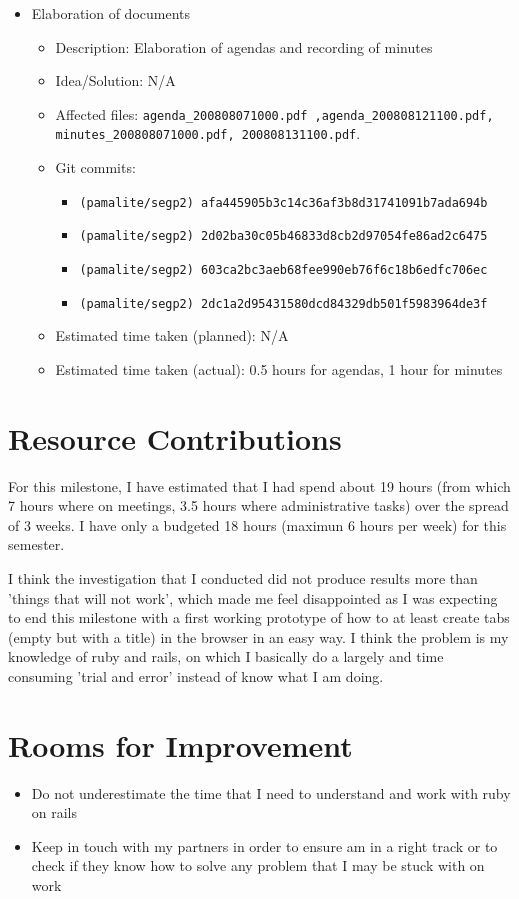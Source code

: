 \documentclass{article}
\begin{document}
\begin{itemize}
\begin{itemize}
	     \end{itemize}
	\item Elaboration of documents
	     \begin{itemize}
	         \item Description: Elaboration of agendas and recording of minutes 
	         \item Idea/Solution: N/A
	         \item Affected files: \texttt{agenda\_200808071000.pdf ,agenda\_200808121100.pdf, minutes\_200808071000.pdf, 200808131100.pdf}.  
	         \item Git commits: \begin{itemize}
	                             \item \texttt{(pamalite/segp2) afa445905b3c14c36af3b8d31741091b7ada694b}
				     \item \texttt{(pamalite/segp2) 2d02ba30c05b46833d8cb2d97054fe86ad2c6475}
				     \item \texttt{(pamalite/segp2) 603ca2bc3aeb68fee990eb76f6c18b6edfc706ec}
				     \item \texttt{(pamalite/segp2) 2dc1a2d95431580dcd84329db501f5983964de3f} 
	                            \end{itemize}
		 \item Estimated time taken (planned): N/A
	         \item Estimated time taken (actual): 0.5 hours for agendas, 1 hour for minutes
	     \end{itemize}
\end{itemize}

\section*{Resource Contributions}

For this milestone, I have estimated that I had spend about 19 hours (from which 7 hours where on meetings, 3.5 hours where administrative tasks) over the spread of 3 weeks. I have only a budgeted 18 hours (maximun 6 hours per week) for this semester. 

I think the investigation that I conducted did not produce results more than 'things that will not work', which made me feel disappointed as I was expecting to end this milestone with a first working prototype of how to at least create tabs (empty but with a title) in the browser in an easy way.  I think the problem is my knowledge of ruby and rails, on which I basically do a largely and time consuming 'trial and error' instead of know what I am doing.

\section*{Rooms for Improvement}

\begin{itemize}
   \item Do not underestimate the time that I need to understand and work with ruby on rails
   \item Keep in touch with my partners in order to ensure am in a right track or to check if they know how to solve any problem that I may be stuck with on work
\end{itemize}
\end{document}
